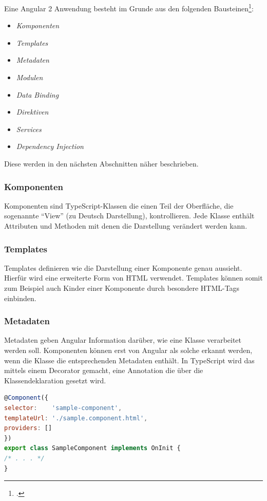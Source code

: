 
Eine Angular 2 Anwendung besteht im Grunde aus den folgenden Bausteinen\footcite[Vgl.][]{Angular.io2017}:

\begin{itemize}
	\item \textit{Komponenten}
	\item \textit{Templates} 
	\item \textit{Metadaten}
	\item \textit{Modulen}
	\item \textit{Data Binding} 
	\item \textit{Direktiven}
	\item \textit{Services}
	\item \textit{Dependency Injection}
\end{itemize}

Diese werden in den nächsten Abschnitten näher beschrieben.

\subsubsection{Komponenten}
Komponenten sind TypeScript-Klassen die einen Teil der Oberfläche, die sogenannte \enquote{View} (zu Deutsch Darstellung), kontrollieren. Jede Klasse enthält Attributen und Methoden mit denen die Darstellung verändert werden kann.

\subsubsection{Templates}
Templates definieren wie die Darstellung einer Komponente genau aussieht. Hierfür wird eine erweiterte Form von \acs{HTML} verwendet. Templates können somit zum Beispiel auch Kinder einer Komponente durch besondere HTML-Tags einbinden. 

\subsubsection{Metadaten}
Metadaten geben Angular Information darüber, wie eine Klasse verarbeitet werden soll. Komponenten können erst von Angular als solche erkannt werden, wenn die Klasse die entsprechenden Metadaten enthält. In TypeScript wird das mittels einem Decorator gemacht, eine Annotation die über die Klassendeklaration gesetzt wird.
\\
\begin{lstlisting}[language=JavaScript,caption={Beispiel Metadaten-Annotation für Komponenten},label=lst:metadata_ex]
@Component({
selector:    'sample-component',
templateUrl: './sample.component.html',
providers: []
})
export class SampleComponent implements OnInit {
/* . . . */
}
\end{lstlisting}

